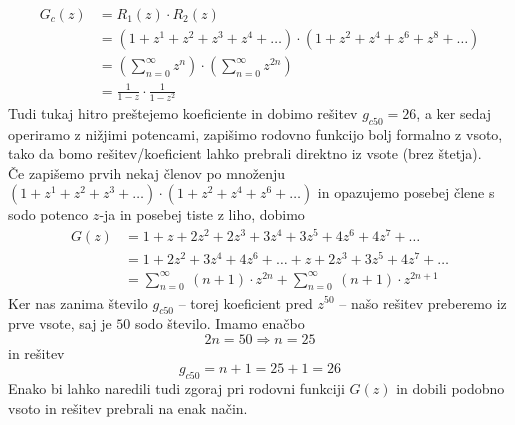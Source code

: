 \documentclass[a4paper,11pt]{article}
\begin{document}
\begin{align*}
    G_c(z) &= R_{1}(z) \cdot R_{2}(z) 
    \\
    &= \left( 1 + z^{1} + z^{2} + z^{3} + z^{4} + \ldots \right) \cdot \left( 1 + z^{2} + z^{4} + z^{6} + z^{8} + \ldots \right)
    \\
    &= \left( \sum_{n = 0}^{\infty} z^{n} \right) \cdot \left( \sum_{n = 0}^{\infty} z^{2n} \right)
    \\
    &= \frac{1}{1 - z} \cdot \frac{1}{1 - z^{2}}   
\end{align*}
Tudi tukaj hitro preštejemo koeficiente in dobimo rešitev $g_{c50} = 26$, a ker sedaj operiramo z nižjimi potencami, zapišimo rodovno funkcijo bolj formalno z vsoto, tako da bomo rešitev/koeficient lahko prebrali direktno iz vsote (brez štetja).
\\
Če zapišemo prvih nekaj členov po množenju $\left( 1 + z^{1} + z^{2} + z^{3} + \ldots \right) \cdot \left( 1 + z^{2} + z^{4} + z^{6} +\ldots \right)$ in opazujemo posebej člene s sodo potenco $z$-ja in posebej tiste z liho, dobimo
\begin{align*}
    G(z) &= 1 + z + 2z^2 + 2z^3 + 3z^4 + 3z^5 + 4z^6 + 4z^7 + \ldots
    \\
    &= 1 + 2z^2 + 3z^4 + 4z^6 + \ldots + z + 2z^3 + 3z^5 + 4z^7 + \ldots
    \\
    &= \sum_{n = 0}^{\infty} \ (n + 1) \cdot z^{2n} + \sum_{n = 0}^{\infty} \ (n + 1) \cdot z^{2n + 1}
\end{align*}
Ker nas zanima število $g_{c50}$ -- torej koeficient pred $z^{50}$ -- našo rešitev preberemo iz prve vsote, saj je $50$ sodo število. Imamo enačbo
$$
2n = 50 \Rightarrow n = 25
$$
in rešitev
$$ 
g_{c50} = n + 1 = 25 + 1 = 26
$$
Enako bi lahko naredili tudi zgoraj pri rodovni funkciji $G(z)$ in dobili podobno vsoto in rešitev prebrali na enak način.
\end{document}
